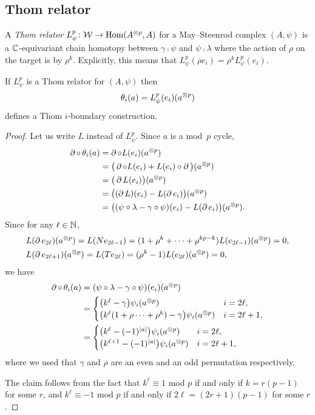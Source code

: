 \subsection{Thom relator}

A \textit{Thom relator} $L_\psi^p \colon \mathcal{W} \to \mathrm{Hom}(A^{\otimes p}, A)$ for a May--Steenrod complex $(A, \psi)$ is a $\mathbb{C}$-equivariant chain homotopy between $\gamma \comp \psi$ and $\psi \comp \lambda$ where the action of $\rho$ on the target is by $\rho^k$.
Explicitly, this means that $L_\psi^p(\rho e_i) = \rho^k L_\psi^p(e_i)$.

\begin{theorem*}
	If $L_\psi^p$ is a Thom relator for $(A, \psi)$ then
	\[
	\theta_i(a) = L_\psi^p(e_i)(a^{\otimes p})
	\]
	defines a Thom $i$-boundary construction.
\end{theorem*}

\begin{proof}
	Let us write $L$ instead of $L_\psi^p$.
	Since $a$ is a mod~$p$ cycle,
	\begin{align*}
		\operatorname{\partial} \mathbin{\circ}\, \theta_i(a) & =
		\operatorname{\partial} \mathbin{\circ} L(e_i)(a^{\otimes p}) \\ & =
		\big(\operatorname{\partial} \mathbin{\circ} L(e_i) + L(e_i) \mathbin{\circ} \operatorname{\partial} \big) (a^{\otimes p}) \\ & =
		\big(\operatorname{\partial} L(e_i)\big)(a^{\otimes p}) \\ & =
		\big((\operatorname{\partial} L)(e_i) - L(\operatorname{\partial} e_i)\big)(a^{\otimes p}) \\ & =
		\big((\psi \mathbin{\circ} \lambda - \gamma \mathbin{\circ} \psi)(e_i) - L(\operatorname{\partial} e_i)\big) (a^{\otimes p}).
	\end{align*}
	Since for any $\ell \in \mathbb{N}$,
	\begin{align*}
		&L(\operatorname{\partial} e_{2\ell})(a^{\otimes p}) = L(N e_{2\ell-1}) = (1+\rho^k+\dots+\rho^{kp-k})L(e_{2\ell-1}) (a^{\otimes p}) = 0, \\
		&L(\operatorname{\partial} e_{2\ell+1})(a^{\otimes p}) = L(T e_{2\ell}) = (\rho^k - 1) L(e_{2\ell})(a^{\otimes p}) = 0,
	\end{align*}
	we have
	\begin{align*}
		\operatorname{\partial} \mathbin{\circ}\, \theta_i(a) & =
		(\psi \mathbin{\circ} \lambda - \gamma \mathbin{\circ} \psi)(e_i)(a^{\otimes p}) \\ & =
		\begin{cases}
			\big(k^\ell - \gamma\big) \psi_i(a^{\otimes p}) & i = 2\ell, \\
			\big(k^\ell (1+\rho\dots+\rho^k) - \gamma\big) \psi_i(a^{\otimes p}) & i = 2\ell+1,
		\end{cases}
		\\ & =
		\begin{cases}
			\big(k^\ell - (-1)^{\lvert a\rvert}\big) \psi_i(a^{\otimes p}) & i = 2\ell, \\
			\big(k^{\ell+1} - (-1)^{\lvert a\rvert}\big) \psi_i(a^{\otimes p}) & i = 2\ell+1,
		\end{cases}
	\end{align*}
	where we used that $\gamma$ and $\rho$ are an even and an odd permutation respectively.

	The claim follows from the fact that $k^\ell \equiv 1$ mod $p$ if and only if $k = r(p-1)$ for some $r$, and $k^\ell \equiv -1$ mod $p$ if and only if $2\ell = (2r+1)(p-1)$ for some $r$.
\end{proof}

